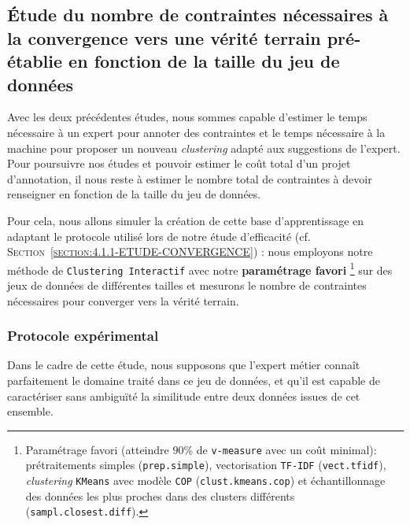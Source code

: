 	\subsection{Étude du nombre de contraintes nécessaires à la convergence vers une vérité terrain pré-établie en fonction de la taille du jeu de données}
	\label{section:4.3.3-ETUDE-COUT-NOMBRE-CONTRAINTES}
			
		Avec les deux précédentes études, nous sommes capable d'estimer le temps nécessaire à un expert pour annoter des contraintes et le temps nécessaire à la machine pour proposer un nouveau \textit{clustering} adapté aux suggestions de l'expert.
		Pour poursuivre nos études et pouvoir estimer le coût total d'un projet d'annotation, il nous reste à estimer le nombre total de contraintes à devoir renseigner en fonction de la taille du jeu de données.
		
		Pour cela, nous allons simuler la création de cette base d'apprentissage en adaptant le protocole utilisé lors de notre étude d'efficacité (cf. \textsc{Section~\ref{section:4.1.1-ETUDE-CONVERGENCE}}) :
		nous employons notre méthode de \texttt{Clustering Interactif} avec notre \textbf{paramétrage favori} \footnote{
			Paramétrage favori (atteindre $90$\% de \texttt{v-measure} avec un coût minimal): prétraitements simples (\texttt{prep.simple}), vectorisation \texttt{TF-IDF} (\texttt{vect.tfidf}), \textit{clustering} \texttt{KMeans} avec modèle \texttt{COP} (\texttt{clust.kmeans.cop}) et échantillonnage des données les plus proches dans des clusters différents (\texttt{sampl.closest.diff}).
		} sur des jeux de données de différentes tailles et mesurons le nombre de contraintes nécessaires pour converger vers la vérité terrain.
	
		\subsubsection{Protocole expérimental}
			
			\begin{leftBarWarning}
				Dans le cadre de cette étude, nous supposons que l'expert métier connaît parfaitement le domaine traité dans ce jeu de données, et qu'il est capable de caractériser sans ambiguïté la similitude entre deux données issues de cet ensemble.
			\end{leftBarWarning}
			
